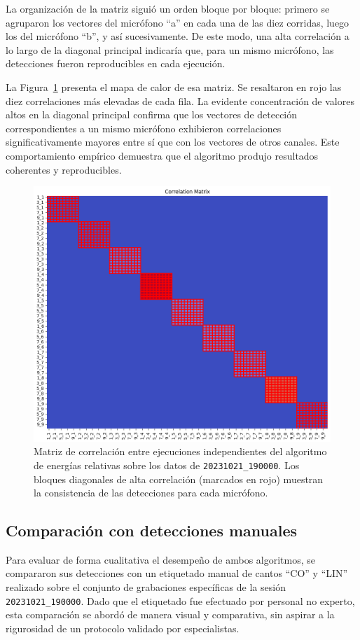 La organización de la matriz siguió un orden bloque por bloque: 
primero se agruparon los vectores del micrófono “a” en cada una 
de las diez corridas, luego los del micrófono “b”, y así 
sucesivamente. De este modo, una alta correlación a lo largo de 
la diagonal principal indicaría que, para un mismo micrófono, 
las detecciones fueron reproducibles en cada ejecución.

La Figura~\ref{fig:correlation} presenta el mapa de calor de esa 
matriz. Se resaltaron en rojo las diez correlaciones más 
elevadas de cada fila. La evidente concentración de valores 
altos en la diagonal principal confirma que los vectores de 
detección correspondientes a un mismo micrófono exhibieron 
correlaciones significativamente mayores entre sí que con los 
vectores de otros canales. Este comportamiento empírico 
demuestra que el algoritmo produjo resultados coherentes y 
reproducibles.

\begin{figure}[ht]
    \centering
    \includegraphics[width=0.7\linewidth]{Graphics/correlation_matrix.png}
    \caption{Matriz de correlación entre ejecuciones independientes del algoritmo de energías relativas sobre los datos de \texttt{20231021\_190000}. Los bloques diagonales de alta correlación (marcados en rojo) muestran la consistencia de las detecciones para cada micrófono.}
    \label{fig:correlation}
\end{figure}


\subsection{Comparación con detecciones manuales}

Para evaluar de forma cualitativa el desempeño de ambos 
algoritmos, se compararon sus detecciones con un etiquetado 
manual de cantos “CO” y “LIN” realizado sobre el conjunto de 
grabaciones específicas de la sesión \texttt{20231021\_190000}. Dado que el 
etiquetado fue efectuado por personal no experto, esta comparación 
se abordó de manera visual y comparativa, sin aspirar a la 
rigurosidad de un protocolo validado por especialistas.  

